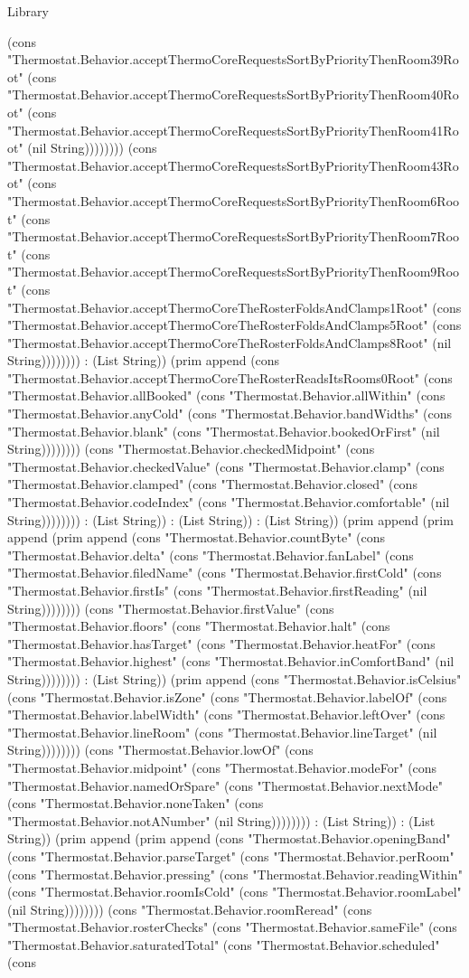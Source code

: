 \begin{lexlean}{Library}
\begin{semanticmodule}
{(cons "Thermostat.Behavior.acceptThermoCoreRequestsSortByPriorityThenRoom39Root" (cons "Thermostat.Behavior.acceptThermoCoreRequestsSortByPriorityThenRoom40Root" (cons "Thermostat.Behavior.acceptThermoCoreRequestsSortByPriorityThenRoom41Root" (nil String)))))))) (cons "Thermostat.Behavior.acceptThermoCoreRequestsSortByPriorityThenRoom43Root" (cons "Thermostat.Behavior.acceptThermoCoreRequestsSortByPriorityThenRoom6Root" (cons "Thermostat.Behavior.acceptThermoCoreRequestsSortByPriorityThenRoom7Root" (cons "Thermostat.Behavior.acceptThermoCoreRequestsSortByPriorityThenRoom9Root" (cons "Thermostat.Behavior.acceptThermoCoreTheRosterFoldsAndClamps1Root" (cons "Thermostat.Behavior.acceptThermoCoreTheRosterFoldsAndClamps5Root" (cons "Thermostat.Behavior.acceptThermoCoreTheRosterFoldsAndClamps8Root" (nil String)))))))) : (List String)) (prim append (cons "Thermostat.Behavior.acceptThermoCoreTheRosterReadsItsRooms0Root" (cons "Thermostat.Behavior.allBooked" (cons "Thermostat.Behavior.allWithin" (cons "Thermostat.Behavior.anyCold" (cons "Thermostat.Behavior.bandWidths" (cons "Thermostat.Behavior.blank" (cons "Thermostat.Behavior.bookedOrFirst" (nil String)))))))) (cons "Thermostat.Behavior.checkedMidpoint" (cons "Thermostat.Behavior.checkedValue" (cons "Thermostat.Behavior.clamp" (cons "Thermostat.Behavior.clamped" (cons "Thermostat.Behavior.closed" (cons "Thermostat.Behavior.codeIndex" (cons "Thermostat.Behavior.comfortable" (nil String)))))))) : (List String)) : (List String)) : (List String)) (prim append (prim append (prim append (cons "Thermostat.Behavior.countByte" (cons "Thermostat.Behavior.delta" (cons "Thermostat.Behavior.fanLabel" (cons "Thermostat.Behavior.filedName" (cons "Thermostat.Behavior.firstCold" (cons "Thermostat.Behavior.firstIs" (cons "Thermostat.Behavior.firstReading" (nil String)))))))) (cons "Thermostat.Behavior.firstValue" (cons "Thermostat.Behavior.floors" (cons "Thermostat.Behavior.halt" (cons "Thermostat.Behavior.hasTarget" (cons "Thermostat.Behavior.heatFor" (cons "Thermostat.Behavior.highest" (cons "Thermostat.Behavior.inComfortBand" (nil String)))))))) : (List String)) (prim append (cons "Thermostat.Behavior.isCelsius" (cons "Thermostat.Behavior.isZone" (cons "Thermostat.Behavior.labelOf" (cons "Thermostat.Behavior.labelWidth" (cons "Thermostat.Behavior.leftOver" (cons "Thermostat.Behavior.lineRoom" (cons "Thermostat.Behavior.lineTarget" (nil String)))))))) (cons "Thermostat.Behavior.lowOf" (cons "Thermostat.Behavior.midpoint" (cons "Thermostat.Behavior.modeFor" (cons "Thermostat.Behavior.namedOrSpare" (cons "Thermostat.Behavior.nextMode" (cons "Thermostat.Behavior.noneTaken" (cons "Thermostat.Behavior.notANumber" (nil String)))))))) : (List String)) : (List String)) (prim append (prim append (cons "Thermostat.Behavior.openingBand" (cons "Thermostat.Behavior.parseTarget" (cons "Thermostat.Behavior.perRoom" (cons "Thermostat.Behavior.pressing" (cons "Thermostat.Behavior.readingWithin" (cons "Thermostat.Behavior.roomIsCold" (cons "Thermostat.Behavior.roomLabel" (nil String)))))))) (cons "Thermostat.Behavior.roomReread" (cons "Thermostat.Behavior.rosterChecks" (cons "Thermostat.Behavior.sameFile" (cons "Thermostat.Behavior.saturatedTotal" (cons "Thermostat.Behavior.scheduled" (cons }
\end{semanticmodule}
\end{lexlean}
